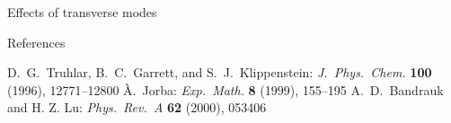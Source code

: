 \documentclass{theo1poster}[2003/04/25]
\begin{document}
\begin{poster}{3}
\begin{sheet}{Effects of transverse modes}
\end{sheet}


\begin{sheet}{References}
\begin{thebibliography}{5}
  D.~G.~Truhlar, B.~C.~Garrett, and S.~J.~Klippenstein:
  \emph{J.~Phys.~Chem.} \textbf{100} (1996), 12771--12800
  \`A.~Jorba: \emph{Exp.~Math.} \textbf{8} (1999), 155--195
  A.~D.~Bandrauk and H. Z. Lu: \emph{Phys.~Rev.~A} \textbf{62} (2000), 053406
\end{thebibliography}
\end{sheet}



\end{poster}
\end{document}
